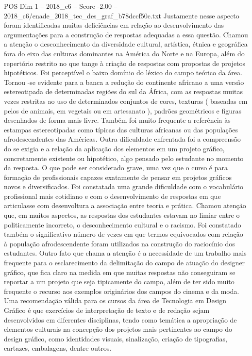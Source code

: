 \begin{textsample}{POS Dim 1 – 2018\_c6 – Score -2.00 – 2018\_c6/enade\_2018\_tec\_des\_graf\_b78dccf50c.txt}
Justamente nesse aspecto foram identificadas muitas deficiências em relação ao desenvolvimento das argumentações para a construção de respostas adequadas a essa questão.
Chamou a atenção o desconhecimento da diversidade cultural, artística, étnica e geográfica fora do eixo das culturas dominantes na América do Norte e na Europa, além do repertório restrito no que tange à criação de respostas com propostas de projetos hipotéticos.
Foi perceptível o baixo domínio do léxico do campo teórico da área.
Tornou -se evidente para a banca a redução do continente africano a uma versão estereotipada de determinadas regiões do sul da África, com as respostas muitas vezes restritas ao uso de determinados conjuntos de cores, texturas ( baseadas em pelos de animais, em vegetais ou em artesanato ), padrões geométricos e figuras desenhados de forma mais livre.
Também foi muito frequente a referência às estampas estereotipadas como típicas das culturas africanas ou das populações afrodescendentes das Américas.
Outra dificuldade enfrentada foi a compreensão do se exigia e a relação da aplicação dos elementos em um projeto gráfico, concretamente existente ou hipotético, algo pensado pelo estudante no momento da resposta.
O que pode ser considerado grave, uma vez que o curso é para formação de profissionais capazes exatamente de pensar em projetos gráficos novos e diversificados.
Foi constatada uma grande dificuldade com o vocabulário profissional mais cotidiano e com o desenvolvimento de respostas em que articulasse com desenvoltura a associação entre teoria e prática.
Chamou atenção que, em muitos aspectos, as respostas dos estudantes estavam no limiar entre o politicamente incorreto, o desconhecimento cultural e o racismo.
Foi constatado também o significativo número de vezes em que termos equivocados com relação à população afrodescendente foram utilizados na construção do raciocínio dos estudantes.
Outro fato que chama a atenção é a necessidade de um trabalho mais frequente para o esclarecimento da delimitação do campo de atuação do designer gráfico, que fica claro na medida em que muitas respostas não conseguiram se reportar a um projeto que seja tipicamente do campo, além de ter sido muito frequente o recurso aos exemplos originários dos campos do cinema e da moda.
Uma recomendação válida para os cursos da área de Tecnologia em Design Gráfico é que exercícios de interpretação de texto e de redação sejam desenvolvidos em diferentes disciplinas, tendo como temática a apropriação de elementos culturais na concepção dos projetos mais pertinentes ao campo do design gráfico, como identidades visuais, sinalização, criação de tipografias, cartazes, embalagens, dentre outros.

\end{textsample}
